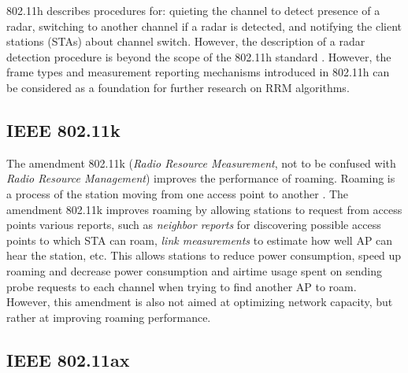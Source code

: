 802.11h describes procedures for: quieting the channel to detect presence of a radar, switching to another channel if a radar is detected, and notifying the client stations (STAs) about channel switch. However, the description of a radar detection procedure is beyond the scope of the 802.11h standard \cite{ieee80211h}.
However, the frame types and measurement reporting mechanisms introduced in 802.11h can be considered as a foundation for further research on RRM algorithms.



\subsection {IEEE 802.11k}
\label{chap:lr:sec:80211k}
The amendment 802.11k \cite{roamingieee80211k} (\textit{Radio Resource Measurement}, not to be confused with \textit{Radio Resource Management}) improves the performance of roaming. Roaming is a process of the station moving from one access point to another \cite{colemanCWNACertifiedWireless2021}. The amendment 802.11k improves roaming by allowing stations to request from access points various reports, such as \textit{neighbor reports} for discovering possible access points to which STA can roam, \textit{ link measurements} to estimate how well AP can hear the station, etc. This allows stations to reduce power consumption, speed up roaming and decrease power consumption and airtime usage spent on sending probe requests to each channel when trying to find another AP to roam.
However, this amendment is also not aimed at optimizing network capacity, but rather at improving roaming performance.

\subsection {IEEE 802.11ax}
\label{chap:lr:sec:80211ax}

